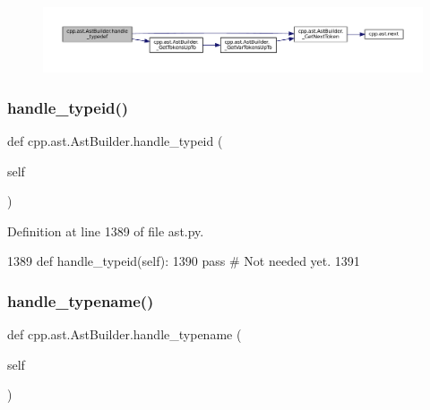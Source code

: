 \nopagebreak
\begin{figure}[H]
\begin{center}
\leavevmode
\includegraphics[width=350pt]{classcpp_1_1ast_1_1AstBuilder_a808eb3d955ca2e3a957abb35dc577c66_cgraph}
\end{center}
\end{figure}
\mbox{\label{classcpp_1_1ast_1_1AstBuilder_ac30cfc1a3a455310a9ccac885d2d0d7c}} 
\subsubsection{\texorpdfstring{handle\+\_\+typeid()}{handle\_typeid()}}
{\footnotesize\ttfamily def cpp.\+ast.\+Ast\+Builder.\+handle\+\_\+typeid (\begin{DoxyParamCaption}\item[{}]{self }\end{DoxyParamCaption})}



Definition at line 1389 of file ast.\+py.


\begin{DoxyCode}
1389     \textcolor{keyword}{def }handle\_typeid(self):
1390         \textcolor{keywordflow}{pass}  \textcolor{comment}{# Not needed yet.}
1391 
\end{DoxyCode}
\mbox{\label{classcpp_1_1ast_1_1AstBuilder_a4b7b3bb4f47f67052b04e5da173d1c6b}} 
\subsubsection{\texorpdfstring{handle\+\_\+typename()}{handle\_typename()}}
{\footnotesize\ttfamily def cpp.\+ast.\+Ast\+Builder.\+handle\+\_\+typename (\begin{DoxyParamCaption}\item[{}]{self }\end{DoxyParamCaption})}



